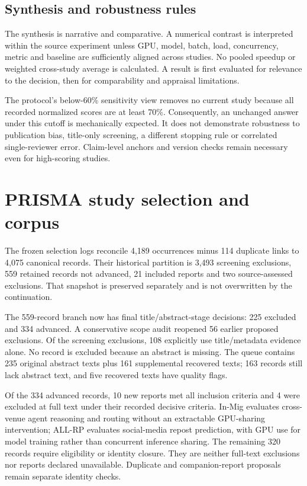\subsection{Synthesis and robustness rules}
The synthesis is narrative and comparative. A numerical contrast is interpreted within the source experiment unless GPU, model, batch, load, concurrency, metric and baseline are sufficiently aligned across studies. No pooled speedup or weighted cross-study average is calculated. A result is first evaluated for relevance to the decision, then for comparability and appraisal limitations.

The protocol's below-60\% sensitivity view removes no current study because all recorded normalized scores are at least 70\%. Consequently, an unchanged answer under this cutoff is mechanically expected. It does not demonstrate robustness to publication bias, title-only screening, a different stopping rule or correlated single-reviewer error. Claim-level anchors and version checks remain necessary even for high-scoring studies.

\section{PRISMA study selection and corpus}
The frozen selection logs reconcile 4,189 occurrences minus 114 duplicate links to 4,075 canonical records. Their historical partition is 3,493 screening exclusions, 559 retained records not advanced, 21 included reports and two source-assessed exclusions. That snapshot is preserved separately and is not overwritten by the continuation.

The 559-record branch now has final title/abstract-stage decisions: 225 excluded and 334 advanced. A conservative scope audit reopened 56 earlier proposed exclusions. Of the screening exclusions, 108 explicitly use title/metadata evidence alone. No record is excluded because an abstract is missing. The queue contains 235 original abstract texts plus 161 supplemental recovered texts; 163 records still lack abstract text, and five recovered texts have quality flags.

Of the 334 advanced records, 10 new reports met all inclusion criteria and 4 were excluded at full text under their recorded decisive criteria. In-Mig evaluates cross-venue agent reasoning and routing without an extractable GPU-sharing intervention; ALL-RP evaluates social-media repost prediction, with GPU use for model training rather than concurrent inference sharing. The remaining 320 records require eligibility or identity closure. They are neither full-text exclusions nor reports declared unavailable. Duplicate and companion-report proposals remain separate identity checks.

